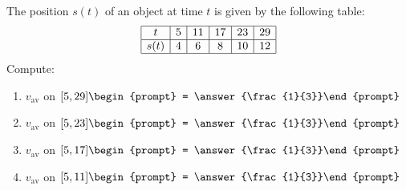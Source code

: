 \documentclass{ximera}
\author{Bart Snapp}
\begin{document}
\begin{exercise}
The position $s(t)$ of an object at time $t$ is given by the following table:
\[
\begin{array}{|c|c|c|c|c|c|}\hline
t &5 &11 &17 &23 &29 \\ \hline
s(t) &4 &6 & 8&10 & 12\\ \hline
\end{array}
\]
Compute:
\begin{enumerate}
\item $v_{\mathrm{av}}$ on $[5,29]\begin{prompt} = \answer{\frac{1}{3}}\end{prompt}$
\item $v_{\mathrm{av}}$ on $[5,23]\begin{prompt} = \answer{\frac{1}{3}}\end{prompt}$
\item $v_{\mathrm{av}}$ on $[5,17]\begin{prompt} = \answer{\frac{1}{3}}\end{prompt}$
\item $v_{\mathrm{av}}$ on $[5,11]\begin{prompt} = \answer{\frac{1}{3}}\end{prompt}$
\end{enumerate}
\end{exercise}
\end{document}
